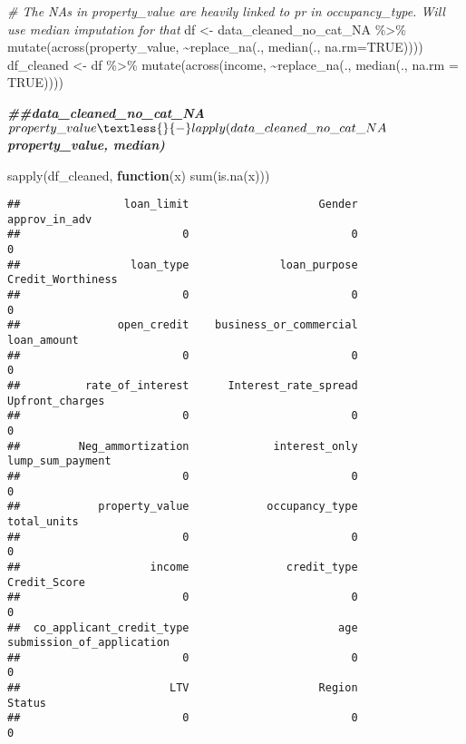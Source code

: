 \documentclass[
]{article}
\newenvironment{Shaded}{\begin{snugshade}}{\end{snugshade}}
\newcommand{\AttributeTok}[1]{\textcolor[rgb]{0.77,0.63,0.00}{#1}}
\newcommand{\CommentTok}[1]{\textcolor[rgb]{0.56,0.35,0.01}{\textit{#1}}}
\newcommand{\ConstantTok}[1]{\textcolor[rgb]{0.00,0.00,0.00}{#1}}
\newcommand{\ControlFlowTok}[1]{\textcolor[rgb]{0.13,0.29,0.53}{\textbf{#1}}}
\newcommand{\DocumentationTok}[1]{\textcolor[rgb]{0.56,0.35,0.01}{\textbf{\textit{#1}}}}
\newcommand{\FunctionTok}[1]{\textcolor[rgb]{0.00,0.00,0.00}{#1}}
\newcommand{\NormalTok}[1]{#1}
\newcommand{\OtherTok}[1]{\textcolor[rgb]{0.56,0.35,0.01}{#1}}
\newcommand{\SpecialCharTok}[1]{\textcolor[rgb]{0.00,0.00,0.00}{#1}}
\begin{document}
\begin{Shaded}
\begin{Highlighting}[]
\CommentTok{\# The NAs in property\_value are heavily linked to pr in occupancy\_type. Will use median imputation for that }
\NormalTok{df }\OtherTok{\textless{}{-}}\NormalTok{ data\_cleaned\_no\_cat\_NA }\SpecialCharTok{\%\textgreater{}\%} \FunctionTok{mutate}\NormalTok{(}\FunctionTok{across}\NormalTok{(property\_value, }\SpecialCharTok{\textasciitilde{}}\FunctionTok{replace\_na}\NormalTok{(., }\FunctionTok{median}\NormalTok{(., }\AttributeTok{na.rm=}\ConstantTok{TRUE}\NormalTok{))))}
\NormalTok{df\_cleaned }\OtherTok{\textless{}{-}}\NormalTok{ df }\SpecialCharTok{\%\textgreater{}\%} \FunctionTok{mutate}\NormalTok{(}\FunctionTok{across}\NormalTok{(income, }\SpecialCharTok{\textasciitilde{}}\FunctionTok{replace\_na}\NormalTok{(., }\FunctionTok{median}\NormalTok{(., }\AttributeTok{na.rm =} \ConstantTok{TRUE}\NormalTok{))))}

\DocumentationTok{\#\#data\_cleaned\_no\_cat\_NA$property\_value \textless{}{-} lapply(data\_cleaned\_no\_cat\_NA$property\_value, median)}
\end{Highlighting}
\end{Shaded}

\begin{Shaded}
\begin{Highlighting}[]
\FunctionTok{sapply}\NormalTok{(df\_cleaned, }\ControlFlowTok{function}\NormalTok{(x) }\FunctionTok{sum}\NormalTok{(}\FunctionTok{is.na}\NormalTok{(x)))}
\end{Highlighting}
\end{Shaded}

\begin{verbatim}
##                loan_limit                    Gender             approv_in_adv 
##                         0                         0                         0 
##                 loan_type              loan_purpose         Credit_Worthiness 
##                         0                         0                         0 
##               open_credit    business_or_commercial               loan_amount 
##                         0                         0                         0 
##          rate_of_interest      Interest_rate_spread           Upfront_charges 
##                         0                         0                         0 
##         Neg_ammortization             interest_only          lump_sum_payment 
##                         0                         0                         0 
##            property_value            occupancy_type               total_units 
##                         0                         0                         0 
##                    income               credit_type              Credit_Score 
##                         0                         0                         0 
##  co_applicant_credit_type                       age submission_of_application 
##                         0                         0                         0 
##                       LTV                    Region                    Status 
##                         0                         0                         0
\end{verbatim}
\end{document}
